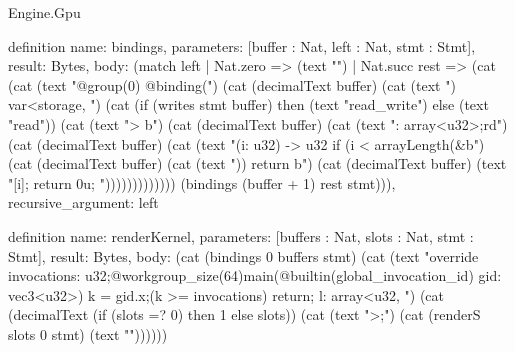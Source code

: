 \begin{lexlean}{Engine.Gpu}
\begin{semanticmodule}
definition{
  name: bindings,
  parameters: [buffer : Nat, left : Nat, stmt : Stmt],
  result: Bytes,
  body: (match left
    | Nat.zero => (text "")
    | Nat.succ rest => (cat (cat (text "@group(0) @binding(") (cat (decimalText buffer) (cat (text ") var<storage, ") (cat (if (writes stmt buffer) then (text "read_write") else (text "read")) (cat (text "> b") (cat (decimalText buffer) (cat (text ": array<u32>;\nfn rd") (cat (decimalText buffer) (cat (text "(i: u32) -> u32 { if (i < arrayLength(&b") (cat (decimalText buffer) (cat (text ")) { return b") (cat (decimalText buffer) (text "[i]; } return 0u; }\n"))))))))))))) (bindings (buffer + 1) rest stmt))),
  recursive_argument: left
}

definition{
  name: renderKernel,
  parameters: [buffers : Nat, slots : Nat, stmt : Stmt],
  result: Bytes,
  body: (cat (bindings 0 buffers stmt) (cat (text "override invocations: u32;\n@compute @workgroup_size(64)\nfn main(@builtin(global_invocation_id) gid: vec3<u32>) {\nlet k = gid.x;\nif (k >= invocations) { return; }\nvar l: array<u32, ") (cat (decimalText (if (slots =? 0) then 1 else slots)) (cat (text ">;\n") (cat (renderS slots 0 stmt) (text "}\n"))))))
}
\end{semanticmodule}
\end{lexlean}
